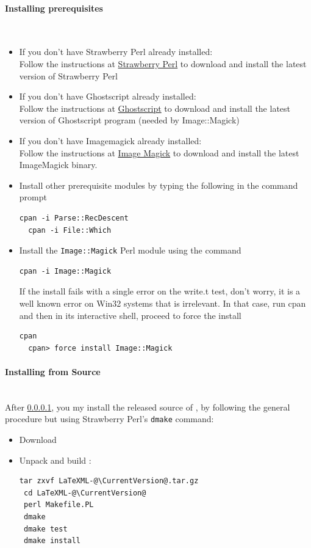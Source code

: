 \documentclass{article}
\begin{document}
\paragraph{Installing prerequisites}\label{install.windows.prerequisites}\\
\begin{itemize}
\item If you don't have Strawberry Perl already installed:\\
   Follow the instructions at \href{http://strawberryperl.com}{Strawberry Perl}
   to download and install the latest version of Strawberry Perl\\
\item If you don't have Ghostscript already installed:\\
   Follow the instructions at \href{http://sourceforge.net/projects/ghostscript/}{Ghostscript}
   to download and install the latest version of Ghostscript program
   (needed by Image::Magick)
\item If you don't have Imagemagick already installed:\\
   Follow the instructions at
   \href{http://www.imagemagick.org/script/binary-releases.php#windows}{Image Magick}
   to download and install the latest ImageMagick binary.
\item Install other prerequisite modules by typing the following in the command prompt
\begin{lstlisting}[style=shell]
  cpan -i Parse::RecDescent
  cpan -i File::Which
\end{lstlisting}
\item Install the \texttt{Image::Magick} Perl module using the command
\begin{lstlisting}[style=shell]
  cpan -i Image::Magick
\end{lstlisting}
 If the install fails with a single error on the write.t test, don't worry,
it is a well known error on Win32 systems that is irrelevant.
In that case, run cpan and then in its interactive shell,
proceed to force the install
\begin{lstlisting}[style=shell]
  cpan
  cpan> force install Image::Magick
\end{lstlisting}
\end{itemize}

\paragraph{Installing from Source}\label{install.windows.source}\\
After \ref{install.windows.prerequisites},
you my install the released source of \LaTeXML,
by following the general procedure but using Strawberry Perl's \texttt{dmake} command:
\begin{itemize}
\item Download \CurrentTarball\\
\item Unpack and build \LaTeXML:
\begin{lstlisting}[style=shell]
 tar zxvf LaTeXML-@\CurrentVersion@.tar.gz
 cd LaTeXML-@\CurrentVersion@
 perl Makefile.PL
 dmake
 dmake test
 dmake install
\end{lstlisting}
\end{itemize}
\end{document}
